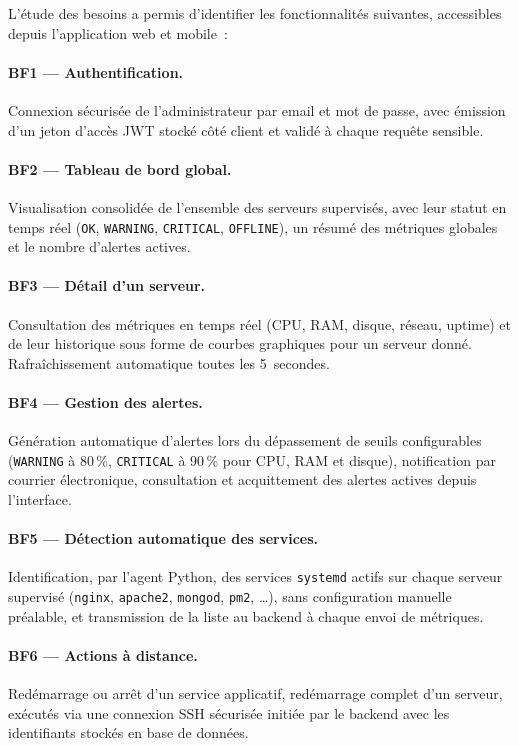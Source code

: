 L'étude des besoins a permis d'identifier les fonctionnalités suivantes, accessibles depuis l'application web et mobile~:

\paragraph{BF1 --- Authentification.} Connexion sécurisée de l'administrateur par email et mot de passe, avec émission d'un jeton d'accès JWT stocké côté client et validé à chaque requête sensible.

\paragraph{BF2 --- Tableau de bord global.} Visualisation consolidée de l'ensemble des serveurs supervisés, avec leur statut en temps réel (\texttt{OK}, \texttt{WARNING}, \texttt{CRITICAL}, \texttt{OFFLINE}), un résumé des métriques globales et le nombre d'alertes actives.

\paragraph{BF3 --- Détail d'un serveur.} Consultation des métriques en temps réel (CPU, RAM, disque, réseau, uptime) et de leur historique sous forme de courbes graphiques pour un serveur donné. Rafraîchissement automatique toutes les 5~secondes.

\paragraph{BF4 --- Gestion des alertes.} Génération automatique d'alertes lors du dépassement de seuils configurables (\texttt{WARNING} à 80\,\%, \texttt{CRITICAL} à 90\,\% pour CPU, RAM et disque), notification par courrier électronique, consultation et acquittement des alertes actives depuis l'interface.

\paragraph{BF5 --- Détection automatique des services.} Identification, par l'agent Python, des services \texttt{systemd} actifs sur chaque serveur supervisé (\texttt{nginx}, \texttt{apache2}, \texttt{mongod}, \texttt{pm2}, \ldots), sans configuration manuelle préalable, et transmission de la liste au backend à chaque envoi de métriques.

\paragraph{BF6 --- Actions à distance.} Redémarrage ou arrêt d'un service applicatif, redémarrage complet d'un serveur, exécutés via une connexion SSH sécurisée initiée par le backend avec les identifiants stockés en base de données.


